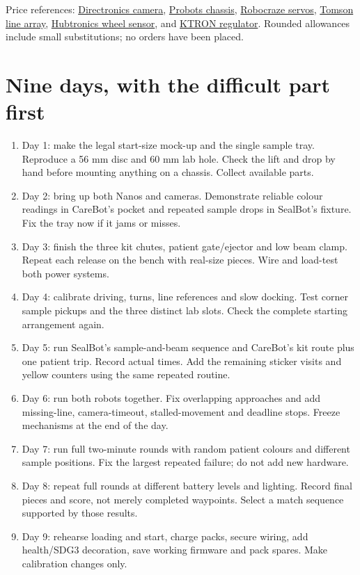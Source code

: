 \documentclass[10pt,a4paper]{article}
\begin{document}
Price references: \href{https://directronics.in/product/esp32-cam-wifi-module-camera-module}{Directronics camera}, \href{https://probots.co.in/2wd-clear-acrylic-smart-robot-chassis-car-kit.html}{Probots chassis}, \href{https://robocraze.com/collections/servo-motors-controllers}{Robocraze servos}, \href{https://www.tomsonelectronics.com/products/5-channel-line-tracking-sensor-module-bfd-1000}{Tomson line array}, \href{https://hubtronics.in/lm393-speed-measuring-sensor-module}{Hubtronics wheel sensor}, and \href{https://www.ktron.in/product/lm2596-step-down-module/}{KTRON regulator}. Rounded allowances include small substitutions; no orders have been placed.

\section{Nine days, with the difficult part first}
\begin{enumerate}
\item Day 1: make the legal start-size mock-up and the single sample tray. Reproduce a 56 mm disc and 60 mm lab hole. Check the lift and drop by hand before mounting anything on a chassis. Collect available parts.
\item Day 2: bring up both Nanos and cameras. Demonstrate reliable colour readings in CareBot's pocket and repeated sample drops in SealBot's fixture. Fix the tray now if it jams or misses.
\item Day 3: finish the three kit chutes, patient gate/ejector and low beam clamp. Repeat each release on the bench with real-size pieces. Wire and load-test both power systems.
\item Day 4: calibrate driving, turns, line references and slow docking. Test corner sample pickups and the three distinct lab slots. Check the complete starting arrangement again.
\item Day 5: run SealBot's sample-and-beam sequence and CareBot's kit route plus one patient trip. Record actual times. Add the remaining sticker visits and yellow counters using the same repeated routine.
\item Day 6: run both robots together. Fix overlapping approaches and add missing-line, camera-timeout, stalled-movement and deadline stops. Freeze mechanisms at the end of the day.
\item Day 7: run full two-minute rounds with random patient colours and different sample positions. Fix the largest repeated failure; do not add new hardware.
\item Day 8: repeat full rounds at different battery levels and lighting. Record final pieces and score, not merely completed waypoints. Select a match sequence supported by those results.
\item Day 9: rehearse loading and start, charge packs, secure wiring, add health/SDG3 decoration, save working firmware and pack spares. Make calibration changes only.
\end{enumerate}
\end{document}
